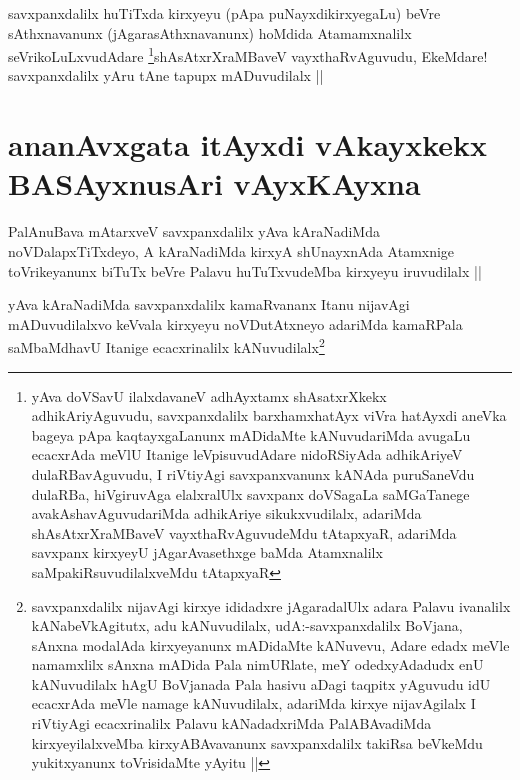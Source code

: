 \begin{artha}
savxpanxdalilx huTiTxda kirxyeyu (pApa puNayxdikirxyegaLu) beVre sAthxnavanunx (jAgarasAthxnavanunx) hoMdida Atamamxnalilx seVrikoLuLxvudAdare \footnote{yAva doVSavU ilalxdavaneV adhAyxtamx shAsatxrXkekx adhikAriyAguvudu, savxpanxdalilx barxhamxhatAyx viVra hatAyxdi aneVka bageya pApa kaqtayxgaLanunx mADidaMte kANuvudariMda avugaLu ecacxrAda meVlU Itanige leVpisuvudAdare nidoRSiyAda adhikAriyeV dulaRBavAguvudu, I riVtiyAgi savxpanxvanunx kANAda puruSaneVdu dulaRBa, hiVgiruvAga elalxralUlx savxpanx doVSagaLa saMGaTanege avakAshavAguvudariMda adhikAriye sikukxvudilalx, adariMda shAsAtxrXraMBaveV vayxthaRvAguvudeMdu tAtapxyaR, adariMda savxpanx kirxyeyU jAgarAvasethxge baMda Atamxnalilx saMpakiRsuvudilalxveMdu tAtapxyaR}shAsAtxrXraMBaveV vayxthaRvAguvudu, EkeMdare! savxpanxdalilx yAru tAne tapupx mADuvudilalx ||
\end{artha}


\section*{ananAvxgata itAyxdi vAkayxkekx BASAyxnusAri vAyxKAyxna}


\begin{artha}
PalAnuBava mAtarxveV savxpanxdalilx yAva kAraNadiMda noVDalapxTiTxdeyo, A kAraNadiMda kirxyA shUnayxnAda Atamxnige toVrikeyanunx biTuTx beVre Palavu huTuTxvudeMba kirxyeyu iruvudilalx ||
\end{artha}


\begin{artha}
yAva kAraNadiMda savxpanxdalilx kamaRvananx Itanu nijavAgi mADuvudilalxvo keVvala kirxyeyu noVDutAtxneyo adariMda kamaRPala saMbaMdhavU Itanige ecacxrinalilx kANuvudilalx\footnote{savxpanxdalilx nijavAgi kirxye ididadxre jAgaradalUlx adara Palavu ivanalilx kANabeVkAgitutx, adu kANuvudilalx, udA:-savxpanxdalilx BoVjana, sAnxna modalAda kirxyeyanunx mADidaMte kANuvevu, Adare edadx meVle namamxlilx sAnxna mADida Pala nimURlate, meY odedxyAdadudx enU kANuvudilalx hAgU BoVjanada Pala hasivu aDagi taqpitx yAguvudu idU ecacxrAda meVle namage kANuvudilalx, adariMda kirxye nijavAgilalx I riVtiyAgi ecacxrinalilx Palavu kANadadxriMda PalABAvadiMda kirxyeyilalxveMba kirxyABAvavanunx savxpanxdalilx takiRsa beVkeMdu yukitxyanunx toVrisidaMte yAyitu ||}
\end{artha}

